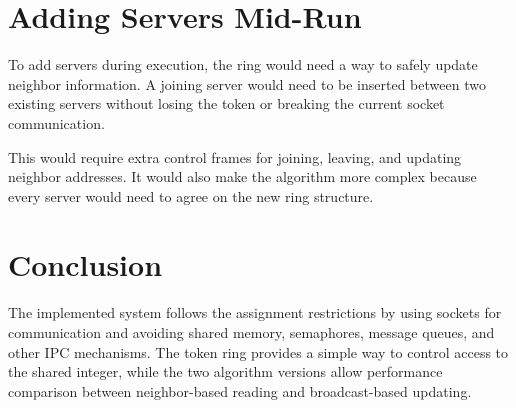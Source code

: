 \documentclass[12pt,a4paper,english]{article}
\begin{document}
\section{Adding Servers Mid-Run}

To add servers during execution, the ring would need a way to safely update neighbor information. A joining server would need to be inserted between two existing servers without losing the token or breaking the current socket communication.

This would require extra control frames for joining, leaving, and updating neighbor addresses. It would also make the algorithm more complex because every server would need to agree on the new ring structure.

\section{Conclusion}

The implemented system follows the assignment restrictions by using sockets for communication and avoiding shared memory, semaphores, message queues, and other IPC mechanisms. The token ring provides a simple way to control access to the shared integer, while the two algorithm versions allow performance comparison between neighbor-based reading and broadcast-based updating.
\end{document}
